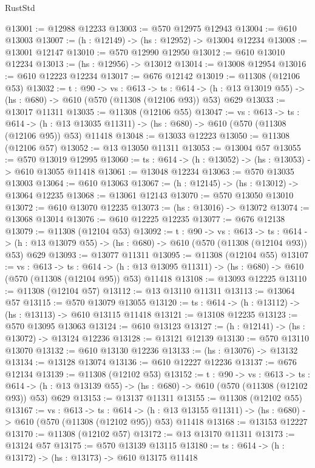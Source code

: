 \begin{lexlean}{RustStd}
\begin{coremodule}
@13001 := @12988 @12233
@13003 := @570 @12975 @12943
@13004 := @610 @13003
@13007 := (h : @12149) -> (hs : @12952) -> @13004 @12234
@13008 := @13001 @12147
@13010 := @570 @12990 @12950
@13012 := @610 @13010 @12234
@13013 := (hs : @12956) -> @13012
@13014 := @13008 @12954
@13016 := @610 @12223 @12234
@13017 := @676 @12142
@13019 := @11308 (@12106 @53)
@13032 := {t : @90} ->
  {vs : @613} ->
  {ts : @614} -> (h : @13 @13019 @55) -> (hs : @680) -> @610 (@570 (@11308 (@12106 @93)) @53) @629
@13033 := @13017 @11311
@13035 := @11308 (@12106 @55)
@13047 := {vs : @613} ->
  {ts : @614} ->
  (h : @13 @13035 @11311) -> (hs : @680) -> @610 (@570 (@11308 (@12106 @95)) @53) @11418
@13048 := @13033 @12223
@13050 := @11308 (@12106 @57)
@13052 := @13 @13050 @11311
@13053 := @13004 @57
@13055 := @570 @13019 @12995
@13060 := {ts : @614} -> (h : @13052) -> (hs : @13053) -> @610 @13055 @11418
@13061 := @13048 @12234
@13063 := @570 @13035 @13003
@13064 := @610 @13063
@13067 := (h : @12145) -> (hs : @13012) -> @13064 @12235
@13068 := @13061 @12143
@13070 := @570 @13050 @13010
@13072 := @610 @13070 @12235
@13073 := (hs : @13016) -> @13072
@13074 := @13068 @13014
@13076 := @610 @12225 @12235
@13077 := @676 @12138
@13079 := @11308 (@12104 @53)
@13092 := {t : @90} ->
  {vs : @613} ->
  {ts : @614} -> (h : @13 @13079 @55) -> (hs : @680) -> @610 (@570 (@11308 (@12104 @93)) @53) @629
@13093 := @13077 @11311
@13095 := @11308 (@12104 @55)
@13107 := {vs : @613} ->
  {ts : @614} ->
  (h : @13 @13095 @11311) -> (hs : @680) -> @610 (@570 (@11308 (@12104 @95)) @53) @11418
@13108 := @13093 @12225
@13110 := @11308 (@12104 @57)
@13112 := @13 @13110 @11311
@13113 := @13064 @57
@13115 := @570 @13079 @13055
@13120 := {ts : @614} -> (h : @13112) -> (hs : @13113) -> @610 @13115 @11418
@13121 := @13108 @12235
@13123 := @570 @13095 @13063
@13124 := @610 @13123
@13127 := (h : @12141) -> (hs : @13072) -> @13124 @12236
@13128 := @13121 @12139
@13130 := @570 @13110 @13070
@13132 := @610 @13130 @12236
@13133 := (hs : @13076) -> @13132
@13134 := @13128 @13074
@13136 := @610 @12227 @12236
@13137 := @676 @12134
@13139 := @11308 (@12102 @53)
@13152 := {t : @90} ->
  {vs : @613} ->
  {ts : @614} -> (h : @13 @13139 @55) -> (hs : @680) -> @610 (@570 (@11308 (@12102 @93)) @53) @629
@13153 := @13137 @11311
@13155 := @11308 (@12102 @55)
@13167 := {vs : @613} ->
  {ts : @614} ->
  (h : @13 @13155 @11311) -> (hs : @680) -> @610 (@570 (@11308 (@12102 @95)) @53) @11418
@13168 := @13153 @12227
@13170 := @11308 (@12102 @57)
@13172 := @13 @13170 @11311
@13173 := @13124 @57
@13175 := @570 @13139 @13115
@13180 := {ts : @614} -> (h : @13172) -> (hs : @13173) -> @610 @13175 @11418

\end{coremodule}
\end{lexlean}
